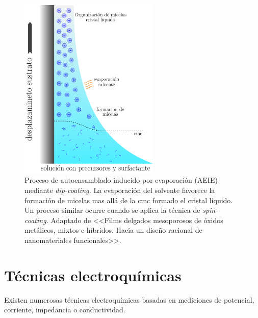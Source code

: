 	 	\begin{figure}[h!]
 				\begin{center}
 				\includegraphics[width=0.60\textwidth]{Esquemas/autoensam.pdf}
 				\caption[Proceso de autoensamblado inducido por evaporación (AEIE)]{Proceso de autoensamblado inducido por evaporación (AEIE) mediante \textit{dip-coating.} La evaporación del solvente favorece la formación de micelas mas allá de la cmc formado el cristal líquido. Un proceso similar ocurre cuando se aplica la técnica de \textit{spin-coating.} Adaptado de <<Films delgados mesoporosos de óxidos metálicos, mixtos e híbridos. Hacia un diseño racional de nanomateriales funcionales>>\cite{Angelome2008}.}
 		   		\label{fig:autoensam}
 		    	\end{center}
 		    	\end{figure}

\section{Técnicas electroquímicas}
					
		Existen numerosas técnicas electroquímicas basadas en mediciones de potencial, corriente, impedancia o conductividad.\cite{Wi2000,Bockris1974,koryta1993}

